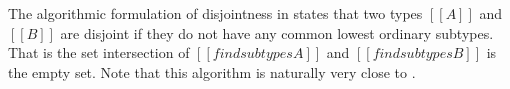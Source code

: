 \noindent The algorithmic formulation of disjointness in
 states that two
types $[[A]]$ and $[[B]]$ are disjoint
if they do not have any common lowest ordinary subtypes. That is the
set intersection of $[[findsubtypes A]]$ and $[[findsubtypes B]]$ is the empty set.
Note that this algorithm is naturally very close to .
\begin{comment}
We illustrate \Cref{def:inter:ad} with a few examples:

\begin{enumerate}
  \item $\boldsymbol{A = [[Int]], \ B = \ [[A -> B]]:}$ \\
        $[[findsubtypes Int]]$ returns \{$[[Int]]$\} and $[[findsubtypes A -> B]]$ returns
        \{$[[Top -> Bot]]$\}. Set intersection of \{$[[Int]]$\} and \{$[[Top -> Bot]]$\} is
        empty set \{\}. Therefore, $[[Int]]$ and $[[A -> B]]$ are disjoint types.
  \item $\boldsymbol{A = [[Int]], \ B = \ [[Bot]]:}$ \\
        $[[findsubtypes Int]]$ returns \{$[[Int]]$\} and $[[findsubtypes Bot]]$ returns
        \{\}. Set intersection of \{$[[Int]]$\} and \{\} is
        empty set \{\}. Therefore, $[[Int]]$ and $[[Bot]]$ are disjoint types.
        In general, type $[[Bot]]$ is disjoint to all types because $[[findsubtypes Bot]]$
        will always return \{\} and intersection of \{\} with all other sets is \{\}.
  \item $\boldsymbol{A = [[Int /\ A -> B]], \ B = \ [[Int]]:}$ \\
        $[[findsubtypes Int /\ A -> B]]$ returns \{\} and $[[findsubtypes Int]]$ returns
        \{$[[Int]]$\}. Set intersection of \{\} and \{$[[Int]]$\} is
        empty set \{\}. Therefore, $[[Int /\ A -> B]]$ and $[[Int]]$ are disjoint types.
        In general, intersection type of two disjoint types which is $[[Int /\ A -> B]]$ in this case,
        is always disjoint to all types.
  \item $\boldsymbol{A = [[Int]], \ B = \ [[Top]]:}$ \\
        $[[findsubtypes Int]]$ returns \{$[[Int]]$\} and $[[findsubtypes Top]]$ returns
        \{$[[Int]]$, $[[Top -> Bot]]$\}.
        Set intersection of \{$[[Int]]$\} and \{$[[Int]]$, $[[Top -> Bot]]$\} is
        set \{$[[Int]]$\}. Therefore, $[[Int]]$ and $[[Top]]$ are not disjoint types.
\end{enumerate}
\end{comment}

